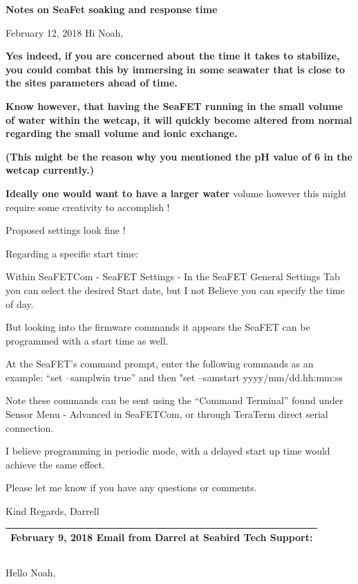 \documentclass[]{book}
\begin{document}
\textbf{Notes on SeaFet soaking and response time}

February 12, 2018 Hi Noah,

\textbf{Yes indeed, if you are concerned about the time it takes to stabilize, you could combat this by immersing in some seawater that is close to the sites parameters ahead of time.}

\textbf{Know however, that having the SeaFET running in the small volume of water within the wetcap, it will quickly become altered from normal regarding the small volume and ionic exchange.}

\textbf{(This might be the reason why you mentioned the pH value of 6 in the wetcap currently.)}

\textbf{Ideally one would want to have a larger water} volume however this might require some creativity to accomplish !

Proposed settings look fine !

Regarding a specific start time:

Within SeaFETCom - SeaFET Settings - In the SeaFET General Settings Tab you can select the desired Start date, but I not Believe you can specify the time of day.

But looking into the firmware commands it appears the SeaFET can be programmed with a start time as well.

At the SeaFET's command prompt, enter the following commands as an example: ``set --samplwin true'' and then "set --samstart yyyy/mm/dd.hh:mm:ss

Note these commands can be sent using the ``Command Terminal'' found under Sensor Menu - Advanced in SeaFETCom, or through TeraTerm direct serial connection.

I believe programming in periodic mode, with a delayed start up time would achieve the same effect.

Please let me know if you have any questions or comments.

Kind Regards,
Darrell

\begin{longtable}[]{@{}l@{}}
\toprule
February 9, 2018 Email from Darrel at Seabird Tech Support:\tabularnewline
\midrule
\endhead
\bottomrule
\end{longtable}

\begin{longtable}[]{@{}l@{}}
\toprule
\endhead
\bottomrule
\end{longtable}

Hello Noah,
\end{document}
